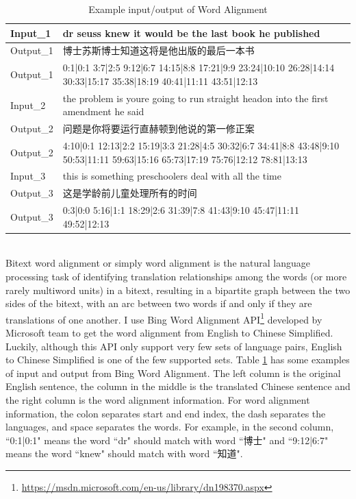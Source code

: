 \begin{table}[ht]
    \caption{Example input/output of Word Alignment}
    \label{table:bing_plus_plus_2}
    \begin{center}
    \begin{tabular}{| p{1.5cm} | p{5cm} |}
        \hline
        Input_1 & dr seuss knew it would be the last book he published\\
        \hline
        Output_1 & 博士苏斯博士知道这将是他出版的最后一本书\\
        \hline
        Output_1 & 0:1|0:1 3:7|2:5 9:12|6:7 14:15|8:8 17:21|9:9 23:24|10:10 26:28|14:14 30:33|15:17 35:38|18:19 40:41|11:11 43:51|12:13 \\
        \hline
        Input_2 & the problem is youre going to run straight headon into the first amendment he said \\
        \hline
        Output_2 & 问题是你将要运行直赫顿到他说的第一修正案\\
        \hline
        Output_2 & 4:10|0:1 12:13|2:2 15:19|3:3 21:28|4:5 30:32|6:7 34:41|8:8 43:48|9:10 50:53|11:11 59:63|15:16 65:73|17:19 75:76|12:12 78:81|13:13 \\
        \hline
        Input_3 & this is something preschoolers deal with all the time\\
        \hline
        Output_3 & 这是学龄前儿童处理所有的时间\\
        \hline
        Output_3 & 0:3|0:0 5:16|1:1 18:29|2:6 31:39|7:8 41:43|9:10 45:47|11:11 49:52|12:13\\
        \hline
    \end{tabular}
    \end{center}
\end{table}
\\
Bitext word alignment or simply word alignment is the natural language processing task of identifying translation relationships among the words (or more rarely multiword units) in a bitext, resulting in a bipartite graph between the two sides of the bitext, with an arc between two words if and only if they are translations of one another. I use Bing Word Alignment API\footnote{\url{https://msdn.microsoft.com/en-us/library/dn198370.aspx}} developed by Microsoft team to get the word alignment from English to Chinese Simplified. Luckily, although this API only support very few sets of language pairs, English to Chinese Simplified is one of the few supported sets. Table \ref{table:bing_plus_plus_2} has some examples of input and output from Bing Word Alignment. The left column is the original English sentence, the column in the middle is the translated Chinese sentence and the right column is the word alignment information. For word alignment information, the colon separates start and end index, the dash separates the languages, and space separates the words. For example, in the second column, ``0:1|0:1" means the word ``dr" should match with word ``博士" and ``9:12|6:7" means the word ``knew" should match with word ``知道".

